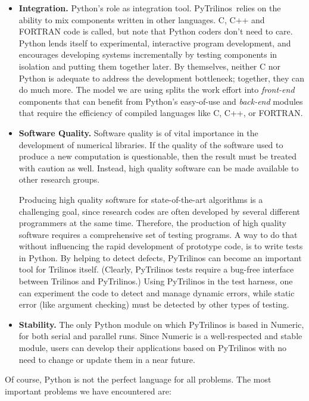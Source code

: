 \documentclass[10pt,relax]{SANDreport}
\newcommand{\PyTrilinos}{{PyTrilinos}}
\begin{document}
\begin{itemize}
\item {\bf Integration.} Python's role as integration
  tool. \PyTrilinos\ relies on the ability to mix components written
  in other languages. C, C++ and FORTRAN code is called, but note that
  Python coders don't need to care.  Python lends itself to
  experimental, interactive program development, and encourages
  developing systems incrementally by testing components in isolation
  and putting them together later.  By themselves, neither C nor
  Python is adequate to address the development bottleneck; together,
  they can do much more.  The model we are using splits the work
  effort into {\sl front-end} components that can benefit from
  Python's easy-of-use and {\sl back-end} modules that require the
  efficiency of compiled languages like C, C++, or FORTRAN.

\item {\bf Software Quality.} Software quality is of vital importance in the
development of numerical libraries. If the quality of the software used to
produce a new computation is questionable, then the result must be treated
with caution as well. Instead, high quality software can be made available to
other research groups. 

Producing high quality software for state-of-the-art algorithms is a
challenging goal, since research codes are often developed by several
different programmers at the same time. Therefore, the production of high
quality software requires a comprehensive set of testing programs. A way to
do that without influencing the rapid development of prototype code, is to
write tests in Python. By helping to detect defects, PyTrilinos can become an
important tool for Trilinos itself. (Clearly, PyTrilinos tests require a
bug-free interface between Trilinos and PyTrilinos.) Using PyTrilinos in the
test harness, one can experiment the code to detect and manage dynamic errors,
  while static error (like argument checking) must be detected by other types
  of testing.

\item {\bf Stability.} The only Python module on which PyTrilinos is based in
Numeric, for both serial and parallel runs. Since Numeric is a well-respected
and stable module, users can develop their applications based on PyTrilinos
with no need to change or update them in a near future.
\end{itemize}

\smallskip

Of course, Python is not the perfect language for all problems. The
most important problems we have encountered are:
\end{document}
